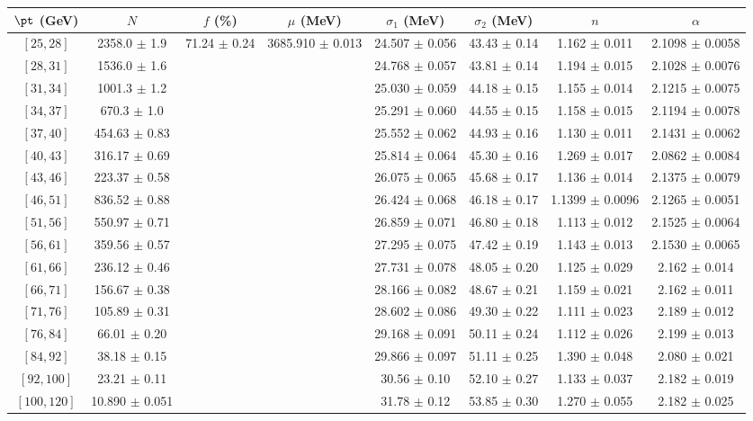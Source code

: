 \begin{tabular}{c||c|c|c|c|c|c|c}
$\pt$ (GeV) & $N$ & $f$ (\%) & $\mu$ (MeV) & $\sigma_1$ (MeV) & $\sigma_2$ (MeV) & $n$ & $\alpha$ \\
\hline
$[25, 28]$ & 2358.0 $\pm$ 1.9 & \multirow{17}{*}{71.24 $\pm$ 0.24} & \multirow{17}{*}{3685.910 $\pm$ 0.013} & 24.507 $\pm$ 0.056 & 43.43 $\pm$ 0.14 & 1.162 $\pm$ 0.011 & 2.1098 $\pm$ 0.0058\\
$[28, 31]$ & 1536.0 $\pm$ 1.6 &  &  & 24.768 $\pm$ 0.057 & 43.81 $\pm$ 0.14 & 1.194 $\pm$ 0.015 & 2.1028 $\pm$ 0.0076\\
$[31, 34]$ & 1001.3 $\pm$ 1.2 &  &  & 25.030 $\pm$ 0.059 & 44.18 $\pm$ 0.15 & 1.155 $\pm$ 0.014 & 2.1215 $\pm$ 0.0075\\
$[34, 37]$ & 670.3 $\pm$ 1.0 &  &  & 25.291 $\pm$ 0.060 & 44.55 $\pm$ 0.15 & 1.158 $\pm$ 0.015 & 2.1194 $\pm$ 0.0078\\
$[37, 40]$ & 454.63 $\pm$ 0.83 &  &  & 25.552 $\pm$ 0.062 & 44.93 $\pm$ 0.16 & 1.130 $\pm$ 0.011 & 2.1431 $\pm$ 0.0062\\
$[40, 43]$ & 316.17 $\pm$ 0.69 &  &  & 25.814 $\pm$ 0.064 & 45.30 $\pm$ 0.16 & 1.269 $\pm$ 0.017 & 2.0862 $\pm$ 0.0084\\
$[43, 46]$ & 223.37 $\pm$ 0.58 &  &  & 26.075 $\pm$ 0.065 & 45.68 $\pm$ 0.17 & 1.136 $\pm$ 0.014 & 2.1375 $\pm$ 0.0079\\
$[46, 51]$ & 836.52 $\pm$ 0.88 &  &  & 26.424 $\pm$ 0.068 & 46.18 $\pm$ 0.17 & 1.1399 $\pm$ 0.0096 & 2.1265 $\pm$ 0.0051\\
$[51, 56]$ & 550.97 $\pm$ 0.71 &  &  & 26.859 $\pm$ 0.071 & 46.80 $\pm$ 0.18 & 1.113 $\pm$ 0.012 & 2.1525 $\pm$ 0.0064\\
$[56, 61]$ & 359.56 $\pm$ 0.57 &  &  & 27.295 $\pm$ 0.075 & 47.42 $\pm$ 0.19 & 1.143 $\pm$ 0.013 & 2.1530 $\pm$ 0.0065\\
$[61, 66]$ & 236.12 $\pm$ 0.46 &  &  & 27.731 $\pm$ 0.078 & 48.05 $\pm$ 0.20 & 1.125 $\pm$ 0.029 & 2.162 $\pm$ 0.014\\
$[66, 71]$ & 156.67 $\pm$ 0.38 &  &  & 28.166 $\pm$ 0.082 & 48.67 $\pm$ 0.21 & 1.159 $\pm$ 0.021 & 2.162 $\pm$ 0.011\\
$[71, 76]$ & 105.89 $\pm$ 0.31 &  &  & 28.602 $\pm$ 0.086 & 49.30 $\pm$ 0.22 & 1.111 $\pm$ 0.023 & 2.189 $\pm$ 0.012\\
$[76, 84]$ & 66.01 $\pm$ 0.20 &  &  & 29.168 $\pm$ 0.091 & 50.11 $\pm$ 0.24 & 1.112 $\pm$ 0.026 & 2.199 $\pm$ 0.013\\
$[84, 92]$ & 38.18 $\pm$ 0.15 &  &  & 29.866 $\pm$ 0.097 & 51.11 $\pm$ 0.25 & 1.390 $\pm$ 0.048 & 2.080 $\pm$ 0.021\\
$[92, 100]$ & 23.21 $\pm$ 0.11 &  &  & 30.56 $\pm$ 0.10 & 52.10 $\pm$ 0.27 & 1.133 $\pm$ 0.037 & 2.182 $\pm$ 0.019\\
$[100, 120]$ & 10.890 $\pm$ 0.051 &  &  & 31.78 $\pm$ 0.12 & 53.85 $\pm$ 0.30 & 1.270 $\pm$ 0.055 & 2.182 $\pm$ 0.025\\
\end{tabular}
